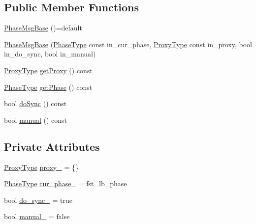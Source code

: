 \subsection*{Public Member Functions}
\begin{DoxyCompactItemize}
\item 
\hyperlink{structvt_1_1vrt_1_1collection_1_1balance_1_1_phase_msg_base_a6dc4fc0633d31368deae1da80cdb9093}{Phase\+Msg\+Base} ()=default
\item 
\hyperlink{structvt_1_1vrt_1_1collection_1_1balance_1_1_phase_msg_base_a10f04955c5a53a65fec9992a9fca8fde}{Phase\+Msg\+Base} (\hyperlink{namespacevt_a46ce6733d5cdbd735d561b7b4029f6d7}{Phase\+Type} const in\+\_\+cur\+\_\+phase, \hyperlink{structvt_1_1vrt_1_1collection_1_1balance_1_1_phase_msg_base_a21c9d10c5a8d1386f4e0a1bfa04f482f}{Proxy\+Type} const in\+\_\+proxy, bool in\+\_\+do\+\_\+sync, bool in\+\_\+manual)
\item 
\hyperlink{structvt_1_1vrt_1_1collection_1_1balance_1_1_phase_msg_base_a21c9d10c5a8d1386f4e0a1bfa04f482f}{Proxy\+Type} \hyperlink{structvt_1_1vrt_1_1collection_1_1balance_1_1_phase_msg_base_a3c7b317ac32bd23c20526952e3aaf499}{get\+Proxy} () const
\item 
\hyperlink{namespacevt_a46ce6733d5cdbd735d561b7b4029f6d7}{Phase\+Type} \hyperlink{structvt_1_1vrt_1_1collection_1_1balance_1_1_phase_msg_base_ac725a307fa6cd208b76e59759428f88c}{get\+Phase} () const
\item 
bool \hyperlink{structvt_1_1vrt_1_1collection_1_1balance_1_1_phase_msg_base_aaf899d4257e3333b7080b3ddc5f77847}{do\+Sync} () const
\item 
bool \hyperlink{structvt_1_1vrt_1_1collection_1_1balance_1_1_phase_msg_base_a972351dacbddafb7d6a5d73d57eda63a}{manual} () const
\end{DoxyCompactItemize}
\subsection*{Private Attributes}
\begin{DoxyCompactItemize}
\item 
\hyperlink{structvt_1_1vrt_1_1collection_1_1balance_1_1_phase_msg_base_a21c9d10c5a8d1386f4e0a1bfa04f482f}{Proxy\+Type} \hyperlink{structvt_1_1vrt_1_1collection_1_1balance_1_1_phase_msg_base_a25805b4bc73c3ae8bc20be02820ffc01}{proxy\+\_\+} = \{\}
\item 
\hyperlink{namespacevt_a46ce6733d5cdbd735d561b7b4029f6d7}{Phase\+Type} \hyperlink{structvt_1_1vrt_1_1collection_1_1balance_1_1_phase_msg_base_a2bc74244216c471b6654b85f35c12456}{cur\+\_\+phase\+\_\+} = fst\+\_\+lb\+\_\+phase
\item 
bool \hyperlink{structvt_1_1vrt_1_1collection_1_1balance_1_1_phase_msg_base_aff1f6203ab4ed470d01395fa3e81387d}{do\+\_\+sync\+\_\+} = true
\item 
bool \hyperlink{structvt_1_1vrt_1_1collection_1_1balance_1_1_phase_msg_base_a4b217aa6869ec997270b373ca3786f72}{manual\+\_\+} = false
\end{DoxyCompactItemize}


